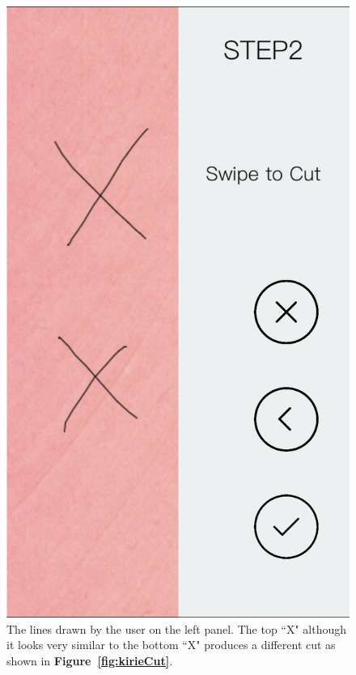 \documentclass[11pt]{article}
\begin{document}
                \begin{figure}[!ht]
                        \begin{minipage}{0.45\textwidth}
                            \centering \includegraphics[width=0.7\linewidth]{Images/kirieXs.png}
                            \caption{The lines drawn by the user on the left panel. The top ``X" although it looks very similar to the bottom ``X" produces a different cut as shown in  \textbf{Figure~\ref{fig:kirieCut}}.\\\\}
                            \label{fig:kirieXs}
                        \end{minipage}\hfill
                        \begin{minipage}{0.45\textwidth}
                            \centering

\end{minipage}
\end{figure}
\end{document}
